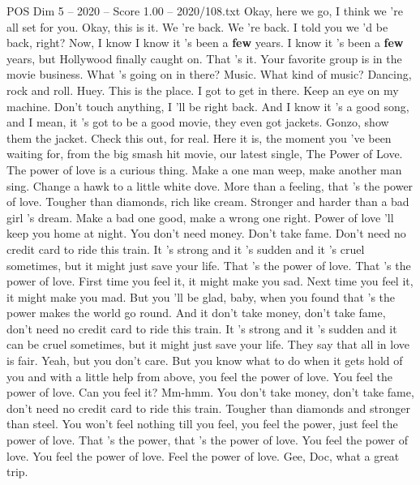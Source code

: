 \begin{textsample}{POS Dim 5 – 2020 – Score 1.00 – 2020/108.txt}  \label{ex:f5_pos_026}
Okay, here we go, I think we 're all set for you.
Okay, this is it.
We 're back.
We 're back.
I told you we 'd be back, right?
Now, I know I know it 's been a \textbf{few} years.
I know it 's been a \textbf{few} years, but Hollywood finally caught on.
That 's it.
Your favorite group is in the movie business.
What 's going on in there?
Music.
What kind of music?
Dancing, rock and roll.
Huey.
This is the place.
I got to get in there.
Keep an eye on my machine.
Don't touch anything, I 'll be right back.
And I know it 's a good song, and I mean, it 's got to be a good movie, they even got jackets.
Gonzo, show them the jacket.
Check this out, for real.
Here it is, the moment you 've been waiting for, from the big smash hit movie, our latest single, The Power of Love.
The power of love is a curious thing.
Make a one man weep, make another man sing.
Change a hawk to a little white dove.
More than a feeling, that 's the power of love.
Tougher than diamonds, rich like cream.
Stronger and harder than a bad girl 's dream.
Make a bad one good, make a wrong one right.
Power of love 'll keep you home at night.
You don't need money.
Don't take fame.
Don't need no credit card to ride this train.
It 's strong and it 's sudden and it 's cruel sometimes, but it might just save your life.
That 's the power of love.
That 's the power of love.
First time you feel it, it might make you sad.
Next time you feel it, it might make you mad.
But you 'll be glad, baby, when you found that 's the power makes the world go round.
And it don't take money, don't take fame, don't need no credit card to ride this train.
It 's strong and it 's sudden and it can be cruel sometimes, but it might just save your life.
They say that all in love is fair.
Yeah, but you don't care.
But you know what to do when it gets hold of you and with a little help from above, you feel the power of love.
You feel the power of love.
Can you feel it?
Mm-hmm.
You don't take money, don't take fame, don't need no credit card to ride this train.
Tougher than diamonds and stronger than steel.
You won't feel nothing till you feel, you feel the power, just feel the power of love.
That 's the power, that 's the power of love.
You feel the power of love.
You feel the power of love.
Feel the power of love.
Gee, Doc, what a great trip.

\end{textsample}
